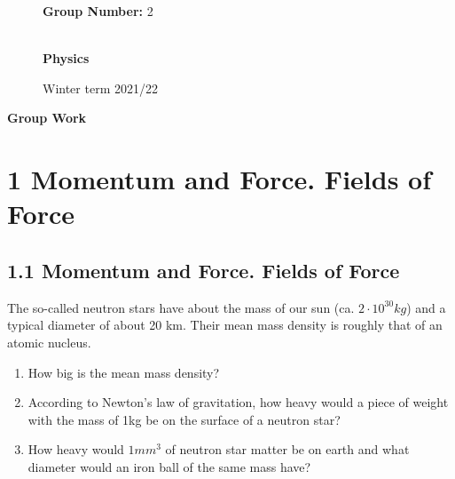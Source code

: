 \documentclass[10pt,ngerman]{scrartcl}
\begin{document}
\begin{figure}[htbp]
\begin{minipage}[b]{0.50\linewidth}
\begin{Large}
	\textbf{Group Number:} 2\\
	\\
	
\end{Large}
\end{minipage}
\begin{minipage}[b]{0.50\linewidth}
\begin{flushright}
\begin{Huge}
\textbf{Physics}\\
\end{Huge}
\vspace{0.5cm}
\begin{large}
Winter term 2021/22
\end{large}
\end{flushright}
\end{minipage}
\end{figure}

\vspace{2cm}
\begin{huge}
\noindent

\textbf{Group Work}
\end{huge}

\section{1 Momentum and Force. Fields of Force}
\subsection{1.1 Momentum and Force. Fields of Force}
The so-called neutron stars have about the mass of our sun (ca. $2 \cdot 10^{30}kg$) and a typical diameter of about 20 km. Their mean mass density is roughly that of an atomic nucleus.
\begin{enumerate}
	\item How big is the mean mass density?
	\item According to Newton's law of gravitation, how heavy would a piece of weight with the mass of 1kg be on the surface of a neutron star?
	\item How heavy would $1mm^3$ of neutron star matter be on earth and what diameter would an iron ball of the same mass have?
\end{enumerate}
\end{document}
